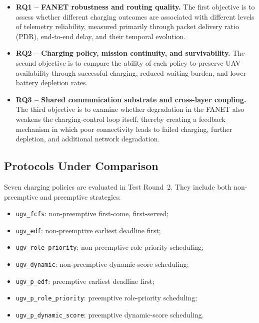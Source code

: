 \begin{itemize}
    \item \textbf{RQ1 -- FANET robustness and routing quality.}
    The first objective is to assess whether different charging outcomes are associated
    with different levels of telemetry reliability, measured primarily through packet
    delivery ratio (PDR), end-to-end delay, and their temporal evolution.

    \item \textbf{RQ2 -- Charging policy, mission continuity, and survivability.}
    The second objective is to compare the ability of each policy to preserve UAV
    availability through successful charging, reduced waiting burden, and lower
    battery depletion rates.

    \item \textbf{RQ3 -- Shared communication substrate and cross-layer coupling.}
    The third objective is to examine whether degradation in the FANET also
    weakens the charging-control loop itself, thereby creating a feedback mechanism
    in which poor connectivity leads to failed charging, further depletion, and
    additional network degradation.
\end{itemize}

\subsection{Protocols Under Comparison}
\label{sec:results:protocols}

Seven charging policies are evaluated in Test Round~2. They include both
non-preemptive and preemptive strategies:

\begin{itemize}
    \item \texttt{ugv\_fcfs}: non-preemptive first-come, first-served;
    \item \texttt{ugv\_edf}: non-preemptive earliest deadline first;
    \item \texttt{ugv\_role\_priority}: non-preemptive role-priority scheduling;
    \item \texttt{ugv\_dynamic}: non-preemptive dynamic-score scheduling;
    \item \texttt{ugv\_p\_edf}: preemptive earliest deadline first;
    \item \texttt{ugv\_p\_role\_priority}: preemptive role-priority scheduling;
    \item \texttt{ugv\_p\_dynamic\_score}: preemptive dynamic-score scheduling.
\end{itemize}

